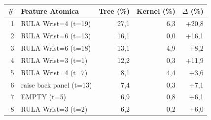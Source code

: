 \begin{tabular*}{\linewidth}{@{}r@{\extracolsep{\fill}}lrrr@{}}
\toprule
\textbf{\#} & \textbf{Feature Atomica} & \textbf{Tree (\%)} & \textbf{Kernel (\%)} & \textbf{$\Delta$ (\%)} \\
\midrule
1 & RULA Wrist=4 (t=19) & 27{,}1 & 6{,}3 & +20{,}8 \\
2 & RULA Wrist=6 (t=13) & 16{,}1 & 0{,}0 & +16{,}1 \\
3 & RULA Wrist=6 (t=18) & 13{,}1 & 4{,}9 & +8{,}2 \\
4 & RULA Wrist=3 (t=1) & 12{,}2 & 0{,}3 & +11{,}9 \\
5 & RULA Wrist=4 (t=7) & 8{,}1 & 4{,}4 & +3{,}6 \\
6 & raise back panel (t=13) & 7{,}4 & 0{,}3 & +7{,}1 \\
7 & EMPTY (t=5) & 6{,}9 & 0{,}8 & +6{,}1 \\
8 & RULA Wrist=3 (t=2) & 6{,}2 & 0{,}2 & +6{,}0 \\
\bottomrule
\end{tabular*}
